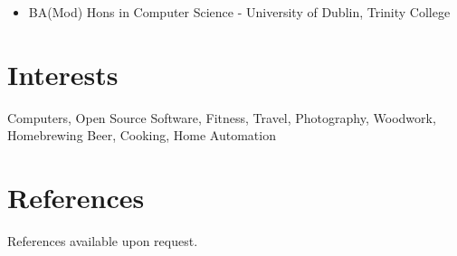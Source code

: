 \documentclass[a4paper, 10pt] {article}
\begin{document}
\begin{itemize}
  \item BA(Mod) Hons in Computer Science - University of Dublin, Trinity College
\end{itemize}

\hrulefill

\section*{Interests}

Computers, Open Source Software, Fitness, Travel, Photography, Woodwork,
Homebrewing Beer, Cooking, Home Automation

\hrulefill

\section*{References}

References available upon request.
\end{document}
